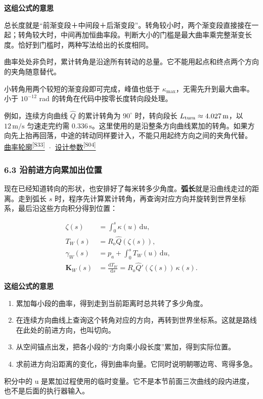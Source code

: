 \documentclass[12pt,a4paper]{article}
\numberwithin{equation}{topic}
\newcommand{\sourceref}[2]{\hyperlink{source-#1}{#2\textsuperscript{[#1]}}}
\begin{document}
\noindent\textbf{这组公式的意思}\par\nobreak
总长度就是“前渐变段＋中间段＋后渐变段”。转角较小时，两个渐变段直接接在一起；转角较大时，中间再加恒曲率段。判断大小的门槛是最大曲率乘完整渐变长度。恰好到门槛时，两种写法给出的长度相同。

曲率处处非负时，累计转角是沿途所有转动的总量。它不能用起点和终点两个方向的夹角随意替代。


小转角用两个较短的渐变段即可完成，峰值也低于 \(\kappa_{\max}\)，无需先升到最大曲率。小于 \(10^{-12}\) rad 的转角在代码中按零长度转向段处理。

例如，连续方向曲线 \(\widehat Q\) 的累计转角为 \(90^\circ\) 时，转向段长 \(L_{\rm turn}\approx4.027\,\mathrm m\)，以 \(12\,\mathrm{m/s}\) 匀速走完约需 \(0.336\,\mathrm s\)。这里使用的是沿整条方向曲线累加的转角。如果方向先上抬再回落，中途的转动同样要计入，不能只用起终方向之间的夹角代替。 \sourceref{S33}{曲率轮廓} · \sourceref{S04}{设计参数}

\subsubsection*{6.3 沿前进方向累加出位置}

现在已经知道转向的形状，也安排好了每米转多少角度。\textbf{弧长}就是沿曲线走过的距离。走到弧长 \(s\) 时，程序先计算累计转角，再查询对应方向并旋转到世界坐标系，最后沿这些方向积分得到位置：

\begin{equation}
\label{eq:spatial}
\begin{aligned}
\zeta(s)&=\int_0^s \kappa(u)\,\mathrm du,\\
T_W(s)&=R_o\widehat Q(\zeta(s)),\\
\gamma_W(s)&=p_a+\int_0^s T_W(u)\,\mathrm du,\\
\mathbf K_W(s)&=\frac{\mathrm dT_W}{\mathrm ds}
=R_o\widehat Q'(\zeta(s))\,\kappa(s).
\end{aligned}
\end{equation}

\noindent\textbf{这组公式的意思}\par\nobreak
\begin{enumerate}
\item 累加每小段的曲率，得到走到当前距离时总共转了多少角度。
\item 在连续方向曲线上查询这个转角对应的方向，再转到世界坐标系。这就是路线在此处的前进方向，也叫切向。
\item 从空间锚点出发，把各小段的“方向乘小段长度”累加，得到实际位置。
\item 求前进方向沿距离的变化，得到曲率向量。它同时说明朝哪边弯、弯得多急。
\end{enumerate}
积分中的 u 是累加过程使用的临时变量。它不是本节前面三次曲线的段内进度，也不是后面的执行器输入。
\end{document}
